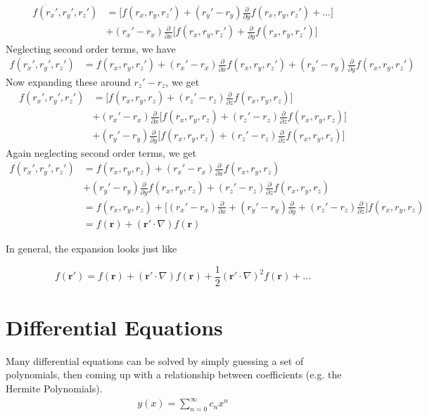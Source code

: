 \begin{align}
f(r_x',r_y',r_z') &= \Big[f(r_x, r_y,r_z') + (r_y'-r_y)\frac{\partial}{\partial y}f(r_x,r_y,r_z') + ...\Big]\\ 
&+ (r_x'-r_x)\frac{\partial}{\partial x}\Big[f(r_x,r_y, r_z') + \frac{\partial}{\partial y}f(r_x,r_y, r_z')\Big]
\end{align}
Neglecting second order terms, we have
\begin{align}
f(r_x',r_y',r_z') &= f(r_x,r_y,r_z') + (r_x'-r_x)\frac{\partial}{\partial x}f(r_x,r_y,r_z') + (r_y'-r_y)\frac{\partial}{\partial y}f(r_x,r_y,r_z')
\end{align}
Now expanding these around $r_z'-r_z$, we get
\begin{align}
f(r_x',r_y',r_z') &= \Big[f(r_x,r_y,r_z) + (r_z'-r_z)\frac{\partial}{\partial z}f(r_x,r_y,r_z)\Big]\\ 
&+ (r_x'-r_x)\frac{\partial}{\partial x}\Big[f(r_x,r_y,r_z) + (r_z'-r_z)\frac{\partial}{\partial z}f(r_x,r_y,r_z)\Big]\\  
&+ (r_y'-r_y)\frac{\partial}{\partial y}\Big[f(r_x,r_y,r_z) + (r_z'-r_z)\frac{\partial}{\partial z}f(r_x,r_y,r_z)\Big]
\end{align}
Again neglecting second order terms, we get
\begin{align}
f(r_x',r_y',r_z') &= f(r_x,r_y,r_z) + (r_x'-r_x)\frac{\partial}{\partial x}f(r_x,r_y,r_z)\\ 
&+ (r_y'-r_y)\frac{\partial}{\partial y}f(r_x,r_y,r_z) + (r_z'-r_z)\frac{\partial}{\partial z}f(r_x,r_y,r_z)\\
&= f(r_x,r_y,r_z) + \Big[(r_x'-r_x)\frac{\partial}{\partial x} + (r_y'-r_y)\frac{\partial}{\partial y} + (r_z'-r_z)\frac{\partial}{\partial z}\Big] f(r_x,r_y,r_z)\\
 &= f(\textbf{r}) + (\textbf{r}'\cdot\nabla) f(\textbf{r})
\end{align}

In general, the expansion looks just like

$$f(\textbf{r}') = f(\textbf{r}) + (\textbf{r}'\cdot\nabla) f(\textbf{r}) + \frac{1}{2}(\textbf{r}'\cdot\nabla)^2 f(\textbf{r}) + ...$$


\section{Differential Equations}
Many differential equations can be solved by simply guessing a set of polynomials, then coming up with a relationship between coefficients (e.g. the Hermite Polynomials).
\begin{align}
	y(x) = \sum_{n=0}^\infty c_n x^n
\end{align}


